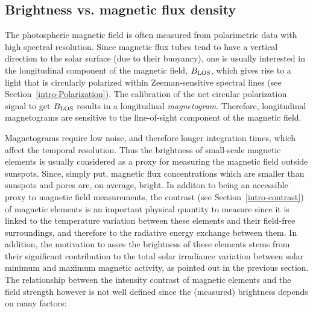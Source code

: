 \documentclass[goettingen, gauss, print]{thesis}
\begin{document}
\subsection{Brightness vs. magnetic flux density }
\label{intro-brightness}
The photospheric magnetic field is often measured from polarimetric data with high spectral resolution. Since magnetic flux tubes tend to have a vertical direction to the solar surface (due to their buoyancy), one is usually interested in the longitudinal component of the magnetic field, $B_{\rm LOS}$, which gives rise to a light that is circularly polarized within Zeeman-sensitive spectral lines (see Section~\ref{intro-Polarization}). The calibration of the net circular polarization signal to get $B_{\rm LOS}$ results in a longitudinal \textit{magnetogram}. Therefore, longitudinal magnetograms are sensitive to the line-of-sight component of the magnetic field.

Magnetograms require low noise, and therefore longer integration times, which affect the temporal resolution. Thus the brightness of small-scale magnetic elements is usually considered as a proxy for measuring the magnetic field outside sunspots. Since, simply put, magnetic flux concentrations which are smaller than sunspots and pores are, on average, bright. In additon to being an accessible proxy to magnetic field measurements, the contrast (see Section~\ref{intro-contrast}) of magnetic elements is an important physical quantity to measure since it is linked to the temperature variation between these elements and their field-free surroundings, and therefore to the radiative energy exchange between them. In addition, the motivation to asses the brightness of these elements stems from their significant contribution to the total solar irradiance variation between solar minimum and maximum magnetic activity, as pointed out in the previous section. The relationship between the intensity contrast of magnetic elements and the field strength however is not well defined since the (measured) brightness depends on many factors: 
\end{document}
